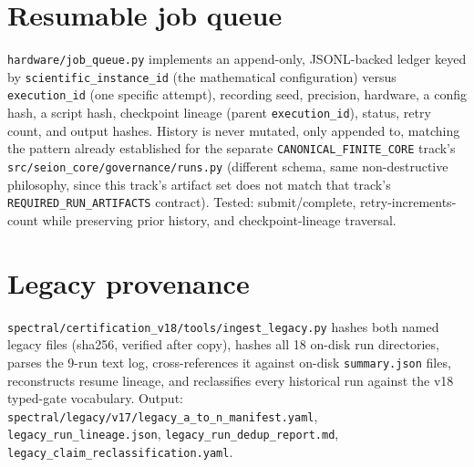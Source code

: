 \documentclass[11pt]{amsart}
\begin{document}
\section{Resumable job queue}
\texttt{hardware/job\_queue.py} implements an append-only, JSONL-backed
ledger keyed by \texttt{scientific\_instance\_id} (the mathematical
configuration) versus \texttt{execution\_id} (one specific attempt),
recording seed, precision, hardware, a config hash, a script hash,
checkpoint lineage (parent \texttt{execution\_id}), status, retry count,
and output hashes. History is never mutated, only appended to, matching
the pattern already established for the separate \texttt{CANONICAL\_FINITE\_CORE}
track's \texttt{src/seion\_core/governance/runs.py} (different schema,
same non-destructive philosophy, since this track's artifact set does not
match that track's \texttt{REQUIRED\_RUN\_ARTIFACTS} contract). Tested:
submit/complete, retry-increments-count while preserving prior history,
and checkpoint-lineage traversal.

\section{Legacy provenance}
\texttt{spectral/certification\_v18/tools/ingest\_legacy.py} hashes both
named legacy files (sha256, verified after copy), hashes all 18 on-disk
run directories, parses the 9-run text log, cross-references it against
on-disk \texttt{summary.json} files, reconstructs resume lineage, and
reclassifies every historical run against the v18 typed-gate vocabulary.
Output: \texttt{spectral/legacy/v17/legacy\_a\_to\_n\_manifest.yaml},
\texttt{legacy\_run\_lineage.json}, \texttt{legacy\_run\_dedup\_report.md},
\texttt{legacy\_claim\_reclassification.yaml}.
\end{document}
